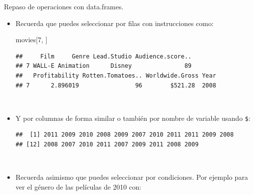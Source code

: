 \documentclass[
  9pt,
  ignorenonframetext,
]{beamer}
\newenvironment{Shaded}{\begin{snugshade}}{\end{snugshade}}
\newcommand{\CommentTok}[1]{\textcolor[rgb]{0.56,0.35,0.01}{\textit{#1}}}
\newcommand{\DecValTok}[1]{\textcolor[rgb]{0.00,0.00,0.81}{#1}}
\newcommand{\KeywordTok}[1]{\textcolor[rgb]{0.13,0.29,0.53}{\textbf{#1}}}
\newcommand{\NormalTok}[1]{#1}
\newcommand{\OperatorTok}[1]{\textcolor[rgb]{0.81,0.36,0.00}{\textbf{#1}}}
\newcommand{\StringTok}[1]{\textcolor[rgb]{0.31,0.60,0.02}{#1}}
\begin{document}
\begin{frame}[fragile]

\begin{block}{Repaso de operaciones con data.frames.}

\begin{itemize}
\item
  Recuerda que puedes seleccionar por filas con instrucciones como:
  \tiny

\begin{Shaded}
\begin{Highlighting}[]
\NormalTok{movies[}\DecValTok{7}\NormalTok{, ]}
\end{Highlighting}
\end{Shaded}

\begin{verbatim}
##     Film     Genre Lead.Studio Audience.score..
## 7 WALL-E Animation      Disney               89
##   Profitability Rotten.Tomatoes.. Worldwide.Gross Year
## 7      2.896019                96        $521.28  2008
\end{verbatim}
\end{itemize}

\normalsize \({ }\)

\begin{itemize}
\item
  Y por columnas de forma similar o también por nombre de variable
  usando \texttt{\$}: \scriptsize

\begin{Shaded}
\end{Shaded}

\begin{verbatim}
##  [1] 2011 2009 2010 2008 2009 2007 2010 2011 2011 2009 2008
## [12] 2008 2007 2010 2011 2007 2009 2011 2008 2009
\end{verbatim}
\end{itemize}

\normalsize \({ }\)

\begin{itemize}
\item
  Recuerda asimismo que puedes seleccionar por condiciones. Por ejemplo
  para ver el género de las películas de 2010 con:

\begin{Shaded}
\end{Shaded}


\end{itemize}
\end{block}
\end{frame}
\end{document}
